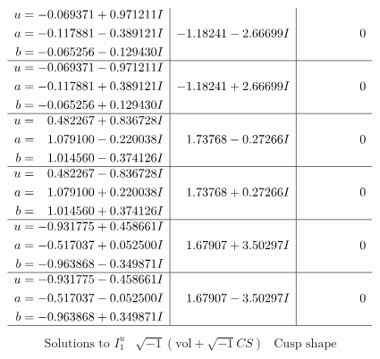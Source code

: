 \documentclass[1p]{elsarticle_modified}
\theoremstyle{definition}
\newcommand{\I}{\sqrt{-1}}
\begin{document}
$$\begin{array}{c|c|c}
\begin{aligned}
u &= -0.069371 + 0.971211 I \\
a &= -0.117881 - 0.389121 I \\
b &= -0.065256 - 0.129430 I\end{aligned}
 & -1.18241 - 2.66699 I & \phantom{-0.000000 } 0 \\ \hline\begin{aligned}
u &= -0.069371 - 0.971211 I \\
a &= -0.117881 + 0.389121 I \\
b &= -0.065256 + 0.129430 I\end{aligned}
 & -1.18241 + 2.66699 I & \phantom{-0.000000 } 0 \\ \hline\begin{aligned}
u &= \phantom{-}0.482267 + 0.836728 I \\
a &= \phantom{-}1.079100 - 0.220038 I \\
b &= \phantom{-}1.014560 - 0.374126 I\end{aligned}
 & \phantom{-}1.73768 - 0.27266 I & \phantom{-0.000000 } 0 \\ \hline\begin{aligned}
u &= \phantom{-}0.482267 - 0.836728 I \\
a &= \phantom{-}1.079100 + 0.220038 I \\
b &= \phantom{-}1.014560 + 0.374126 I\end{aligned}
 & \phantom{-}1.73768 + 0.27266 I & \phantom{-0.000000 } 0 \\ \hline\begin{aligned}
u &= -0.931775 + 0.458661 I \\
a &= -0.517037 + 0.052500 I \\
b &= -0.963868 - 0.349871 I\end{aligned}
 & \phantom{-}1.67907 + 3.50297 I & \phantom{-0.000000 } 0 \\ \hline\begin{aligned}
u &= -0.931775 - 0.458661 I \\
a &= -0.517037 - 0.052500 I \\
b &= -0.963868 + 0.349871 I\end{aligned}
 & \phantom{-}1.67907 - 3.50297 I & \phantom{-0.000000 } 0\\
 \hline 
 \end{array}$$\newpage$$\begin{array}{c|c|c}  
\text{Solutions to }I^u_{1}& \I (\text{vol} + \sqrt{-1}CS) & \text{Cusp shape}\\
 \hline 
\begin{aligned}

\end{aligned}
\end{array}$$
\end{document}
